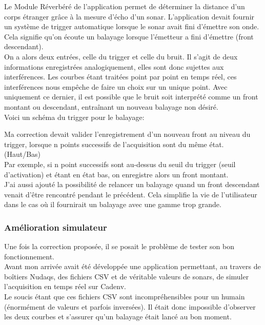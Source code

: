\documentclass{rapport}
\begin{document}
Le Module Réverbéré de l'application permet de déterminer la distance d'un corps étranger grâce à la mesure d'écho d'un sonar. L'application devait fournir un système de trigger automatique lorsque le sonar avait fini d'émettre son onde. Cela signifie qu'on écoute un balayage lorsque l'émetteur a fini d'émettre (front descendant).\\

On a alors deux entrées, celle du trigger et celle du bruit. Il s'agit de deux informations enregistrées analogiquement, elles sont donc sujettes aux interférences. Les courbes étant traitées point par point en temps réel, ces interférences nous empêche de faire un choix sur un unique point. Avec uniquement ce dernier, il est possible que le bruit soit interprété comme un front montant ou descendant, entraînant un nouveau balayage non désiré.\\

Voici un schéma du trigger pour le balayage:



Ma correction devait valider l'enregistrement d'un nouveau front au niveau du trigger, lorsque n points successifs de l'acquisition sont du même état. (Haut/Bas)\\
Par exemple, si n point successifs sont au-dessus du seuil du trigger (seuil d'activation) et étant en état bas, on enregistre alors un front montant.\\

J'ai aussi ajouté la possibilité de relancer un balayage quand un front descendant venait d'être rencontré pendant le précédent. Cela simplifie la vie de l'utilisateur dans le cas où il fournirait un balayage avec une gamme trop grande.

\subsubsection{Amélioration simulateur}

Une fois la correction proposée, il se posait le problème de tester son bon fonctionnement. \\

Avant mon arrivée avait été développée une application permettant, au travers de boîtiers Nudaqs, des fichiers CSV et de véritable valeurs de sonars, de simuler l'acquisition en temps réel sur Cadenv.\\
Le soucis étant que ces fichiers CSV sont incompréhensibles pour un humain (énormément de valeurs et parfois inversées). Il était donc impossible d'observer les deux courbes et s'assurer qu'un balayage était lancé au bon moment.
\end{document}
